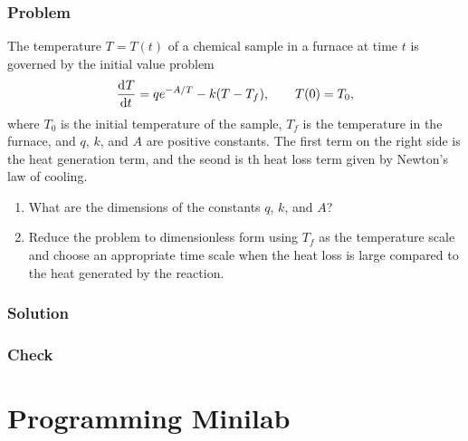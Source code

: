 \documentclass[12pt]{article}
\begin{document}
\subsubsection*{Problem}

The temperature $T=T(t)$ of a chemical sample in a furnace at time $t$ is
governed by the initial value problem
$$\frac{\mathrm{d}^{} {T}}{\mathrm{d}{t}^{}}=qe^{-A/T}-k(T-T_f),\qquad T(0)=T_0,$$ where $T_0$ is the initial
temperature of the sample, $T_f$ is the temperature in the furnace, and $q$,
$k$, and $A$ are positive constants. The first term on the right side is the
heat generation term, and the seond is th heat loss term given by Newton's law
of cooling.
\begin{enumerate}
\item What are the dimensions of the constants $q$, $k$, and $A$?
\item Reduce the problem to dimensionless form using $T_f$ as the temperature
  scale and choose an appropriate time scale when the heat loss is large
  compared to the heat generated by the reaction.
\end{enumerate}

\subsubsection*{Solution}
\todo
\subsubsection*{Check}
\todo

\section{Programming Minilab}
\todo
\end{document}
